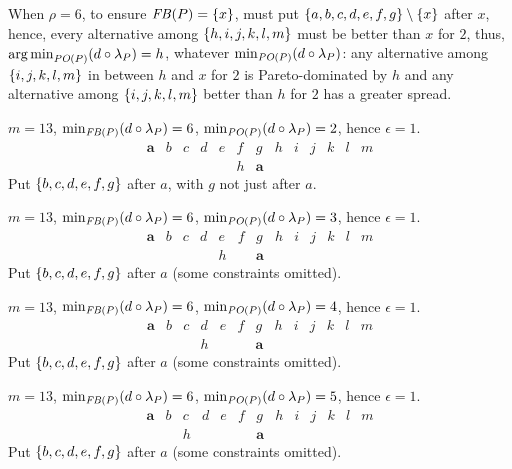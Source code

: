 \documentclass[pagesize, twoside=off, bibliography=totoc, DIV=calc, fontsize=12pt, a4paper]{scrartcl}
\begin{document}
When $\rho = 6$, to ensure $\mathit{FB}(P) = \{x\}$, must put $\{a, b, c, d, e, f, g\} \setminus \{x\}$ after $x$, hence, every alternative among $\{h, i, j, k, l, m\}$ must be better than $x$ for $2$, thus, $\operatorname*{arg\,min}_{\mathit{PO}(P)} (d \circ \lambda_P) = h$, whatever $\minineq[\POP]$: any alternative among $\{i, j, k, l, m\}$ in between $h$ and $x$ for $2$ is Pareto-dominated by $h$ and any alternative among $\{i, j, k, l, m\}$ better than $h$ for $2$ has a greater spread.

\begin{example}
	$m = 13$, $\minineq[\FBP] = 6$, $\minineq[\POP] = 2$, hence $\epsilon = 1$.
	\begin{equation}
		\begin{array}{lllllllllllll}
			\bm{a}	& b	& c	& d	& e	& f	& g	& h	& i & j & k & l & m\\
			& & & & & h & \bm{a}
		\end{array}
	\end{equation}
	Put $\{b, c, d, e, f, g\}$ after $a$, with $g$ not just after $a$.
\end{example}

\begin{example}
	$m = 13$, $\minineq[\FBP] = 6$, $\minineq[\POP] = 3$, hence $\epsilon = 1$.
	\begin{equation}
		\begin{array}{lllllllllllll}
			\bm{a}	& b	& c	& d	& e	& f	& g	& h	& i & j & k & l & m\\
			& & & & h & & \bm{a}
		\end{array}
	\end{equation}
	Put $\{b, c, d, e, f, g\}$ after $a$ (some constraints omitted).
\end{example}

\begin{example}
	$m = 13$, $\minineq[\FBP] = 6$, $\minineq[\POP] = 4$, hence $\epsilon = 1$.
	\begin{equation}
		\begin{array}{lllllllllllll}
			\bm{a}	& b	& c	& d	& e	& f	& g	& h	& i & j & k & l & m\\
			& & & h & & & \bm{a}
		\end{array}
	\end{equation}
	Put $\{b, c, d, e, f, g\}$ after $a$ (some constraints omitted).
\end{example}

\begin{example}
	$m = 13$, $\minineq[\FBP] = 6$, $\minineq[\POP] = 5$, hence $\epsilon = 1$.
	\begin{equation}
		\begin{array}{lllllllllllll}
			\bm{a}	& b	& c	& d	& e	& f	& g	& h	& i & j & k & l & m\\
			& & h & & & & \bm{a}
		\end{array}
	\end{equation}
	Put $\{b, c, d, e, f, g\}$ after $a$ (some constraints omitted).
\end{example}
\end{document}
